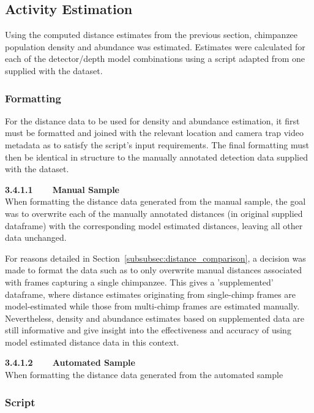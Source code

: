 \subsection{Activity Estimation}

Using the computed distance estimates from the previous section, chimpanzee population
density and abundance was estimated.
Estimates were calculated for each of the detector/depth model combinations using a
script adapted from one supplied with the dataset.

\subsubsection{Formatting}

For the distance data to be used for density and abundance estimation, it first must be
formatted and joined with the relevant location and camera trap video metadata as to
satisfy the script's input requirements.
The final formatting must then be identical in structure to the manually annotated
detection data supplied with the dataset.

\vspace{3mm}

\textbf{3.4.1.1~~~~Manual Sample}\vspace{4.5mm}\\
When formatting the distance data generated from the manual sample, the goal was to
overwrite each of the manually annotated distances (in original supplied dataframe)
with the corresponding model estimated distances, leaving all other data unchanged.

For reasons detailed in Section~\ref{subsubsec:distance_comparison}, a decision was
made to format the data such as to only overwrite manual distances associated with
frames capturing a single chimpanzee.
This gives a 'supplemented' dataframe, where distance estimates originating from
single-chimp frames are model-estimated while those from multi-chimp frames are estimated
manually.
Nevertheless, density and abundance estimates based on supplemented data are still
informative and give insight into the effectiveness and accuracy of using model estimated
distance data in this context.

\vspace{3mm}

\textbf{3.4.1.2~~~~Automated Sample}\vspace{4.5mm}\\
When formatting the distance data generated from the automated sample

\subsubsection{Script}